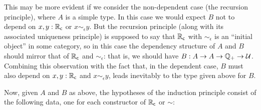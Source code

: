 This may be more evident if we consider the non-dependent case (the recursion principle), where $A$ is a simple type.
In this case we would expect $B$ not to depend on $x,y:\mathbb{R}_\mathsf{c}$ or $x\sim_\epsilon y$.
But the recursion principle (along with its associated uniqueness principle) is supposed to say that $\mathbb{R}_\mathsf{c}$ with $\sim_\epsilon$ is an ``initial object'' in some category, so in this case the dependency structure of $A$ and $B$ should mirror that of $\mathbb{R}_\mathsf{c}$ and $\sim_\epsilon$: that is, we should have $B:A\to A\to \mathbb{Q}_{+} \to \mathcal{U}$.
Combining this observation with the fact that, in the dependent case, $B$ must also depend on $x,y:\mathbb{R}_\mathsf{c}$ and $x\sim_\epsilon y$, leads inevitably to the type given above for $B$.

Now, given $A$ and $B$ as above, the hypotheses of the induction principle consist of the following data, one for each constructor of $\mathbb{R}_\mathsf{c}$ or $\sim$:
